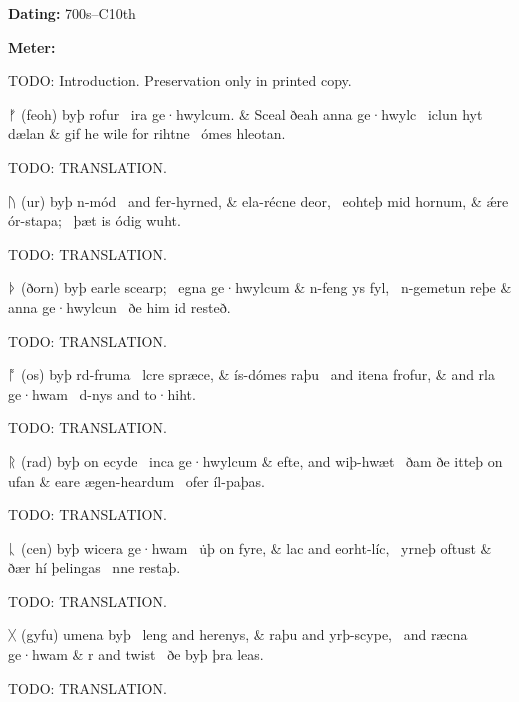 \begin{flushright}%
\textbf{Dating:} 700s–C10th%

\textbf{Meter:} \Fornyrdislag%
\end{flushright}%

TODO: Introduction.  Preservation only in printed copy.

\sectionline


\bvg\bva%
ᚠ (feoh) byþ rofur \hld\ ira ge·hwylcum. &
Sceal ðeah anna ge·hwylc \hld\ iclun hyt dælan &
gif he wile for rihtne \hld\ ómes hleotan.\eva

\bvb TODO: TRANSLATION.\evb\evg


\bvg\bva%
ᚢ (ur) byþ n-mód \hld\ and fer-hyrned, &
ela-récne deor, \hld\ eohteþ mid hornum, &
ǽre ór-stapa; \hld\ þæt is ódig wuht.\eva

\bvb TODO: TRANSLATION.\evb\evg


\bvg\bva%
ᚦ (ðorn) byþ earle scearp; \hld\ egna ge·hwylcum &
n-feng ys fyl, \hld\ n-gemetun reþe &
anna ge·hwylcun \hld\ ðe him id resteð.\eva

\bvb TODO: TRANSLATION.\evb\evg


\bvg\bva%
ᚩ (os) byþ rd-fruma \hld\ lcre spræce, &
ís-dómes raþu \hld\ and itena frofur, &
and rla ge·hwam \hld\ d-nys and to·hiht.\eva

\bvb TODO: TRANSLATION.\evb\evg


\bvg\bva%
ᚱ (rad) byþ on ecyde \hld\ inca ge·hwylcum &
efte, and wiþ-hwæt \hld\ ðam ðe itteþ on ufan &
eare ægen-heardum \hld\ ofer íl-paþas.\eva

\bvb TODO: TRANSLATION.\evb\evg


\bvg\bva%
ᚳ (cen) byþ wicera ge·hwam \hld\ u̇þ on fyre, &
lac and eorht-líc, \hld\ yrneþ oftust &
ðær hí þelingas \hld\ nne restaþ.\eva

\bvb TODO: TRANSLATION.\evb\evg


\bvg\bva%
ᚷ (gyfu) umena byþ \hld\ leng and herenys, &
raþu and yrþ-scype, \hld\ and ræcna ge·hwam &
r and twist \hld\ ðe byþ þra leas.\eva

\bvb TODO: TRANSLATION.\evb\evg


